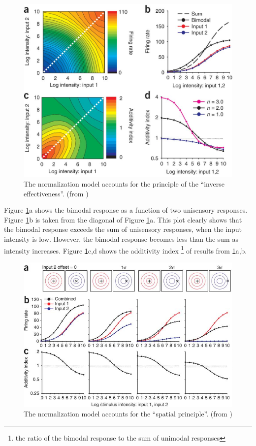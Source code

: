 \documentclass{article}[11pt]
\begin{document}
\begin{figure}[tpb]
  \centering
  \includegraphics[width=.6\textwidth]{inverse2}
  \caption{The normalization model accounts for the principle of the ``inverse effectiveness''. (from \cite{ohshiro_normalization_2011})}
  \label{fig:inverse}
\end{figure}

    Figure \ref{fig:inverse}a shows the bimodal response as a function of two unisensory responses. Figure \ref{fig:inverse}b is taken from the diagonal of Figure \ref{fig:inverse}a. This plot clearly shows that the bimodal response exceeds the sum of unisensory responses, when the input intensity is low. However, the bimodal response becomes less than the sum as intensity increases.
    Figure \ref{fig:inverse}c,d shows the additivity index \footnote{the ratio of the bimodal response to the sum of unimodal responses} of results from \ref{fig:inverse}a,b.

\begin{figure}[tpb]
  \centering
  \includegraphics[width=.8\textwidth]{spatial2}
  \caption{The normalization model accounts for the ``spatial principle''. (from \cite{ohshiro_normalization_2011})}
  \label{fig:spatial}
\end{figure}
\end{document}
